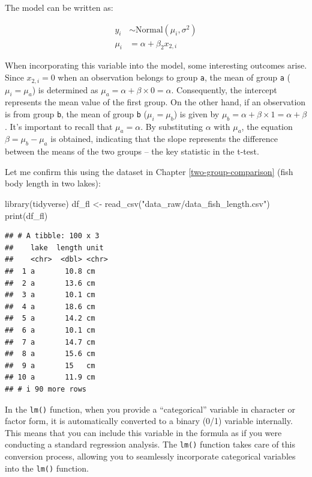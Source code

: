 \documentclass[
]{book}
\newenvironment{Shaded}{\begin{snugshade}}{\end{snugshade}}
\newcommand{\FunctionTok}[1]{\textcolor[rgb]{0.00,0.00,0.00}{#1}}
\newcommand{\NormalTok}[1]{#1}
\newcommand{\OtherTok}[1]{\textcolor[rgb]{0.56,0.35,0.01}{#1}}
\newcommand{\StringTok}[1]{\textcolor[rgb]{0.31,0.60,0.02}{#1}}
\begin{document}
The model can be written as:

\[
\begin{aligned}
y_i &\sim \text{Normal}(\mu_i, \sigma^2)\\
\mu_i &= \alpha + \beta_2 x_{2,i}
\end{aligned}
\]

When incorporating this variable into the model, some interesting outcomes arise. Since \(x_{2,i} = 0\) when an observation belongs to group \texttt{a}, the mean of group \texttt{a} (\(\mu_i = \mu_a\)) is determined as \(\mu_a = \alpha + \beta \times 0 = \alpha\). Consequently, the intercept represents the mean value of the first group. On the other hand, if an observation is from group \texttt{b}, the mean of group \texttt{b} (\(\mu_i = \mu_b\)) is given by \(\mu_b = \alpha + \beta \times 1 = \alpha + \beta\). It's important to recall that \(\mu_a = \alpha\). By substituting \(\alpha\) with \(\mu_a\), the equation \(\beta = \mu_b - \mu_a\) is obtained, indicating that the slope represents the difference between the means of the two groups -- the key statistic in the t-test.

Let me confirm this using the dataset in Chapter \ref{two-group-comparison} (fish body length in two lakes):

\begin{Shaded}
\begin{Highlighting}[]
\FunctionTok{library}\NormalTok{(tidyverse)}
\NormalTok{df\_fl }\OtherTok{\textless{}{-}} \FunctionTok{read\_csv}\NormalTok{(}\StringTok{"data\_raw/data\_fish\_length.csv"}\NormalTok{)}
\FunctionTok{print}\NormalTok{(df\_fl)}
\end{Highlighting}
\end{Shaded}

\begin{verbatim}
## # A tibble: 100 x 3
##    lake  length unit 
##    <chr>  <dbl> <chr>
##  1 a       10.8 cm   
##  2 a       13.6 cm   
##  3 a       10.1 cm   
##  4 a       18.6 cm   
##  5 a       14.2 cm   
##  6 a       10.1 cm   
##  7 a       14.7 cm   
##  8 a       15.6 cm   
##  9 a       15   cm   
## 10 a       11.9 cm   
## # i 90 more rows
\end{verbatim}

In the \texttt{lm()} function, when you provide a ``categorical'' variable in character or factor form, it is automatically converted to a binary (0/1) variable internally. This means that you can include this variable in the formula as if you were conducting a standard regression analysis. The \texttt{lm()} function takes care of this conversion process, allowing you to seamlessly incorporate categorical variables into the \texttt{lm()} function.
\end{document}
